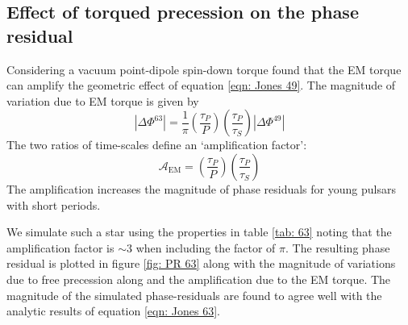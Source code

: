 \documentclass[../full_thesis/full_thesis.tex]{subfiles}
\begin{document}


\subsection{Effect of torqued precession on the phase residual}
\label{sec: phase residual torqued}
Considering a vacuum point-dipole spin-down torque \citet{Jones2001} found that
the EM torque can amplify the geometric effect of equation \eqref{eqn: Jones
49}. The magnitude of variation due to EM torque is given by
\begin{equation}
    |\Delta\Phi^{63}| = \frac{1}{\pi}\left(\frac{\tau_{P}}{P}\right)
    \left(\frac{\tau_{P}}{\tau_{S}}\right)
                                    |\Delta\Phi^{49}|
\label{eqn: Jones 63}
\end{equation}
The two ratios of time-scales define an `amplification factor':
\begin{equation}
    \mathcal{A}_{\mathrm{EM}} = \left(\frac{\tau_{P}}{P}\right)
                                \left(\frac{\tau_{P}}{\tau_{S}}\right)
\label{eqn: EM amplification}
\end{equation}
The amplification increases
the magnitude of phase residuals for young pulsars with short periods.

We simulate such a star using the properties in table \ref{tab: 63} noting that
the amplification factor is $\sim 3$ when including the factor of $\pi$. The
resulting phase residual is plotted in figure \ref{fig: PR 63} along with the
magnitude of variations due to free precession along and the amplification due
to the EM torque. The magnitude of the simulated phase-residuals are found to
agree well with the analytic results of equation \eqref{eqn: Jones 63}.

\end{document}
